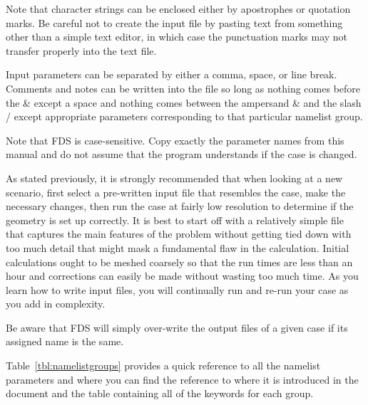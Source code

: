 \documentclass[11pt]{book}
\begin{document}
\begin{warning}
\noindent
Note that character strings can be enclosed either by apostrophes or quotation marks.
Be careful not to create the input file by pasting text from something other than a
simple text editor, in which case the punctuation marks may not transfer
properly into the text file.
\end{warning}

\noindent
Input parameters can be separated by either a comma, space, or line break.
Comments and notes can be written into the file so long as nothing comes
before the {\ct \&} except a space and nothing comes between the ampersand
{\ct \&} and the slash {\ct /} except appropriate parameters corresponding
to that particular namelist group.

\begin{warning}
\noindent
Note that FDS is case-sensitive. Copy
exactly the parameter names from this manual and do not assume that the
program understands if the case is changed.
\end{warning}

\noindent
As stated previously, it is strongly recommended that when looking at a new scenario,
first select a pre-written input file that resembles the case,
make the necessary changes, then run the case at fairly low
resolution to determine if the geometry is set up correctly.
It is best to start off with a relatively simple file that captures the main
features of the problem without getting tied down with too much detail that
might mask a fundamental flaw in the calculation. Initial calculations ought
to be meshed coarsely so that the run times are less than an hour and
corrections can easily be made without wasting too much time.
As you learn how to write input files, you will continually
run and re-run your case as you add in complexity.

\begin{warning}
Be aware that FDS will simply over-write the output files of a given case if its assigned
name is the same.
\end{warning}

\noindent
Table~\ref{tbl:namelistgroups} provides a quick reference to all the namelist parameters and
where you can find the reference to where it is introduced in the document and the
table containing all of the keywords for each group.
\end{document}
